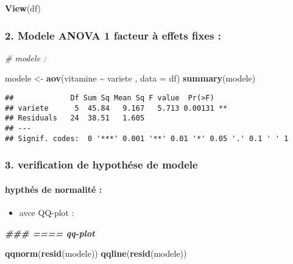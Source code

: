 \documentclass[
]{article}
\newenvironment{Shaded}{\begin{snugshade}}{\end{snugshade}}
\newcommand{\AttributeTok}[1]{\textcolor[rgb]{0.13,0.29,0.53}{#1}}
\newcommand{\CommentTok}[1]{\textcolor[rgb]{0.56,0.35,0.01}{\textit{#1}}}
\newcommand{\DocumentationTok}[1]{\textcolor[rgb]{0.56,0.35,0.01}{\textbf{\textit{#1}}}}
\newcommand{\FunctionTok}[1]{\textcolor[rgb]{0.13,0.29,0.53}{\textbf{#1}}}
\newcommand{\NormalTok}[1]{#1}
\newcommand{\OtherTok}[1]{\textcolor[rgb]{0.56,0.35,0.01}{#1}}
\newcommand{\SpecialCharTok}[1]{\textcolor[rgb]{0.81,0.36,0.00}{\textbf{#1}}}
\providecommand{\tightlist}{%
  \setlength{\itemsep}{0pt}\setlength{\parskip}{0pt}}
\begin{document}
\begin{Shaded}
\begin{Highlighting}[]
\FunctionTok{View}\NormalTok{(df)}
\end{Highlighting}
\end{Shaded}

\hypertarget{modele-anova-1-facteur-uxe0-effets-fixes}{%
\subsubsection{2. Modele ANOVA 1 facteur à effets fixes
:}\label{modele-anova-1-facteur-uxe0-effets-fixes}}

\begin{Shaded}
\begin{Highlighting}[]
\CommentTok{\# modele :}

\NormalTok{modele }\OtherTok{\textless{}{-}} \FunctionTok{aov}\NormalTok{(vitamine }\SpecialCharTok{\textasciitilde{}}\NormalTok{ variete , }\AttributeTok{data =}\NormalTok{ df)}
\FunctionTok{summary}\NormalTok{(modele)}
\end{Highlighting}
\end{Shaded}

\begin{verbatim}
##             Df Sum Sq Mean Sq F value  Pr(>F)   
## variete      5  45.84   9.167   5.713 0.00131 **
## Residuals   24  38.51   1.605                   
## ---
## Signif. codes:  0 '***' 0.001 '**' 0.01 '*' 0.05 '.' 0.1 ' ' 1
\end{verbatim}

\hypertarget{verification-de-hypothuxe9se-de-modele}{%
\subsubsection{3. verification de hypothése de
modele}\label{verification-de-hypothuxe9se-de-modele}}

\hypertarget{hypthuxe9s-de-normalituxe9}{%
\paragraph{hypthés de normalité :}\label{hypthuxe9s-de-normalituxe9}}

\begin{itemize}
\tightlist
\item
  avce QQ-plot :
\end{itemize}

\begin{Shaded}
\begin{Highlighting}[]
\DocumentationTok{\#\#\# ==== qq{-}plot}

\FunctionTok{qqnorm}\NormalTok{(}\FunctionTok{resid}\NormalTok{(modele))}
\FunctionTok{qqline}\NormalTok{(}\FunctionTok{resid}\NormalTok{(modele))}
\end{Highlighting}
\end{Shaded}
\end{document}
